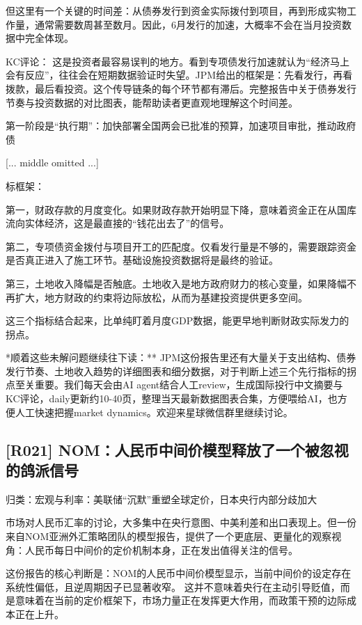 \documentclass[11pt]{ctexart}
\begin{document}
但这里有一个关键的时间差：从债券发行到资金实际拨付到项目，再到形成实物工作量，通常需要数周甚至数月。因此，6月发行的加速，大概率不会在当月投资数据中完全体现。

KC评论： 这是投资者最容易误判的地方。看到专项债发行加速就认为“经济马上会有反应”，往往会在短期数据验证时失望。JPM给出的框架是：先看发行，再看拨款，最后看投资。这个传导链条的每个环节都有滞后。完整报告中关于债券发行节奏与投资数据的对比图表，能帮助读者更直观地理解这个时间差。

第一阶段是“执行期”：加快部署全国两会已批准的预算，加速项目审批，推动政府债

[... middle omitted ...]

标框架：

第一，财政存款的月度变化。如果财政存款开始明显下降，意味着资金正在从国库流向实体经济，这是最直接的“钱花出去了”的信号。

第二，专项债资金拨付与项目开工的匹配度。仅看发行量是不够的，需要跟踪资金是否真正进入了施工环节。基础设施投资数据将是最终的验证。

第三，土地收入降幅是否触底。土地收入是地方政府财力的核心变量，如果降幅不再扩大，地方财政的约束将边际放松，从而为基建投资提供更多空间。

这三个指标结合起来，比单纯盯着月度GDP数据，能更早地判断财政实际发力的拐点。

*顺着这些未解问题继续往下读：** JPM这份报告里还有大量关于支出结构、债券发行节奏、土地收入趋势的详细图表和细分数据，对于判断上述三个先行指标的拐点至关重要。我们每天会由AI agent结合人工review，生成国际投行中文摘要与KC评论，daily更新约10-40页，整理当天最新数据图表合集，方便喂给AI，也方便人工快速把握market dynamics。欢迎来星球微信群里继续讨论。

\subsection{[R021] NOM：人民币中间价模型释放了一个被忽视的鸽派信号}
{\small\color{refgray}归类：宏观与利率：美联储“沉默”重塑全球定价，日本央行内部分歧加大}

市场对人民币汇率的讨论，大多集中在央行意图、中美利差和出口表现上。但一份来自NOM亚洲外汇策略团队的模型报告，提供了一个更底层、更量化的观察视角：人民币每日中间价的定价机制本身，正在发出值得关注的信号。

这份报告的核心判断是：NOM的人民币中间价模型显示，当前中间价的设定存在系统性偏低，且逆周期因子已显著收窄。 这并不意味着央行在主动引导贬值，而是意味着在当前的定价框架下，市场力量正在发挥更大作用，而政策干预的边际成本正在上升。
\end{document}
